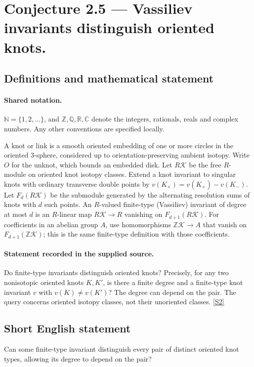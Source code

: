 \documentclass[11pt]{article}
\newcommand{\sref}[2]{\hyperlink{source:#1:#2}{[S#2]}}
\begin{document}
\section{Conjecture 2.5 — Vassiliev invariants distinguish oriented knots.}\label{statement}

\subsection{Definitions and mathematical statement}

\paragraph{Shared notation.}$\mathbb N=\{1,2,\ldots\}$, and $\mathbb Z,\mathbb Q,\mathbb R,\mathbb C$ denote the integers, rationals, reals and complex numbers. Any other conventions are specified locally.


A knot or link is a smooth oriented embedding of one or more circles in the oriented $3$-sphere, considered up to orientation-preserving ambient isotopy. Write $O$ for the unknot, which bounds an embedded disk. Let $R\mathcal K$ be the free $R$-module on oriented knot isotopy classes. Extend a knot invariant to singular knots with ordinary transverse double points by $v(K_\times)=v(K_+)-v(K_-)$. Let $F_d(R\mathcal K)$ be the submodule generated by the alternating resolution sums of knots with $d$ such points. An $R$-valued finite-type (Vassiliev) invariant of degree at most $d$ is an $R$-linear map $R\mathcal K\to R$ vanishing on $F_{d+1}(R\mathcal K)$. For coefficients in an abelian group $A$, use homomorphisms $\mathbb Z\mathcal K\to A$ that vanish on $F_{d+1}(\mathbb Z\mathcal K)$; this is the same finite-type definition with those coefficients.
\paragraph{Statement recorded in the supplied source.}
Do finite-type invariants distinguish oriented knots? Precisely, for any two nonisotopic oriented knots $K,K'$, is there a finite degree and a finite-type knot invariant $v$ with $v(K)\ne v(K')$? The degree can depend on the pair. The query concerns oriented isotopy classes, not their unoriented classes. \sref{statement}{2}
\subsection{Short English statement}
Can some finite-type invariant distinguish every pair of distinct oriented knot types, allowing its degree to depend on the pair?
\end{document}

